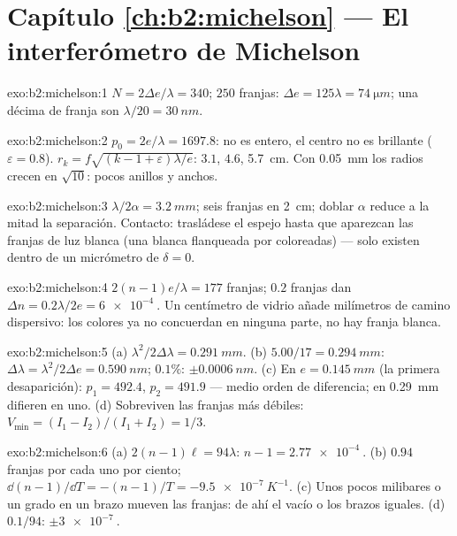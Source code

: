 \section*{Capítulo \ref{ch:b2:michelson} --- El interferómetro de Michelson}

\begin{solution}{exo:b2:michelson:1}
$N = 2\Delta e/\lambda = 340$; $250$ franjas: $\Delta e = 125\lambda = \qty{74}{\micro m}$; una décima de
franja son $\lambda/20 = \qty{30}{nm}$.
\end{solution}

\begin{solution}{exo:b2:michelson:2}
$p_0 = 2e/\lambda = 1697.8$: no es entero, el centro no es brillante ($\varepsilon =
0.8$). $r_k = f\sqrt{(k - 1 + \varepsilon)\lambda/e}$: $3.1$, $4.6$, \qty{5.7}{cm}. Con \qty{0.05}{mm} los
radios crecen en $\sqrt{10}$: pocos anillos y anchos.
\end{solution}

\begin{solution}{exo:b2:michelson:3}
$\lambda/2\alpha = \qty{3.2}{mm}$; seis franjas en \qty{2}{cm}; doblar $\alpha$ reduce a la mitad la
separación. Contacto: trasládese el espejo hasta que aparezcan las franjas de luz
blanca (una blanca flanqueada por coloreadas) --- solo existen dentro de
un micrómetro de $\delta = 0$.
\end{solution}

\begin{solution}{exo:b2:michelson:4}
$2(n - 1)e/\lambda = 177$ franjas; $0.2$ franjas dan $\Delta n = 0.2\lambda/2e = \qty{6e-4}{}$.
Un centímetro de vidrio añade milímetros de camino dispersivo: los colores
ya no concuerdan en ninguna parte, no hay franja blanca.
\end{solution}

\begin{solution}{exo:b2:michelson:5}
(a) $\lambda^2/2\Delta\lambda = \qty{0.291}{mm}$. (b) $5.00/17 = \qty{0.294}{mm}$: $\Delta\lambda = \lambda^2/2\Delta e =
\qty{0.590}{nm}$; $0.1\%$: $\pm\qty{0.0006}{nm}$. (c) En $e = \qty{0.145}{mm}$ (la primera
desaparición): $p_1 = 492.4$, $p_2 = 491.9$ --- medio orden de diferencia; en
\qty{0.29}{mm} difieren en uno. (d) Sobreviven las franjas más débiles: $V_{\min} =
(I_1 - I_2)/(I_1 + I_2) = 1/3$.
\end{solution}

\begin{solution}{exo:b2:michelson:6}
(a) $2(n - 1)\ell = 94\lambda$: $n - 1 = \qty{2.77e-4}{}$. (b) $0.94$ franjas por cada uno por ciento;
$\dd(n - 1)/\dd T = -(n - 1)/T = \qty{-9.5e-7}{K^{-1}}$. (c) Unos pocos milibares o un
grado en un brazo mueven las franjas: de ahí el vacío o los brazos iguales. (d)
$0.1/94$: $\pm\qty{3e-7}{}$.
\end{solution}

